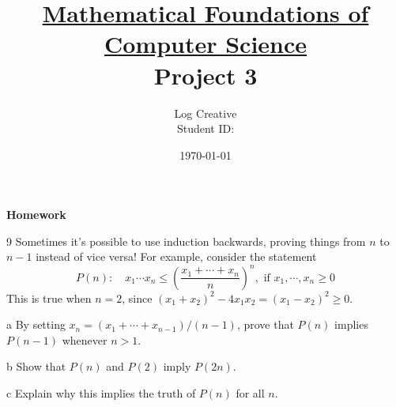 \documentclass[a4paper,12pt]{article}
\title{\small \underline{Mathematical Foundations of Computer Science}\\\Large Project 3}
\author{Log Creative\\\small Student ID: }
\date{\today}
\makeatletter
\newtheorem*{solution}{Solution}
\theoremstyle{definition}
\renewenvironment{solution}[1][Solution] {\par\pushQED{\qed}\normalfont\topsep6\p@\@plus6\p@\relax\trivlist\item[\hskip\labelsep\bfseries#1\@addpunct{.}]\ignorespaces}{\popQED\endtrivlist\@endpefalse} \makeatother
\newenvironment{problems}{\begin{list}{}{\renewcommand{\makelabel}[1]{\textbf{##1}\hfil}}}{\end{list}}
\newenvironment{steps}{\begin{list}{}{\renewcommand{\makelabel}[1]{\textbf{##1}\hfil}}}{\end{list}}
\makeatother
\begin{document}
\maketitle

\noindent\textbf{Homework}

\begin{problems}
    \item[9] Sometimes it's possible to use induction backwards, proving things from
    $n$ to $n - 1$ instead of vice versa! For example, consider the statement
    \begin{equation*}
        P(n):\quad x_1\cdots x_n \leq \left(\frac{x_1+\cdots+x_n}{n}\right)^n, \text{ if } x_1,\cdots,x_n\geq 0
    \end{equation*}
    This is true when $n=2$, since $(x_1+x_2)^2-4x_1x_2=(x_1-x_2)^2\geq 0$.
        \begin{steps}
            \item[a] By setting $x_n = (x_1+\cdots+x_{n-1})/(n - 1)$, prove that $P(n)$ implies
            $P(n - 1)$ whenever $n > 1$.
            \item[b] Show that $P(n)$ and $P(2)$ imply $P(2n)$.
            \item[c] Explain why this implies the truth of $P(n)$ for all $n$. 
        \end{steps}
    \begin{solution}


\end{solution}
\end{problems}
\end{document}
